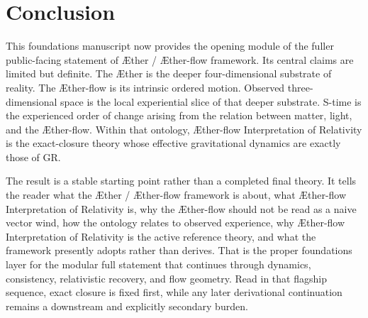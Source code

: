\documentclass[11pt]{article}
\newcommand{\Aether}{\AE{}ther}
\newcommand{\Aflow}{\AE{}ther-flow}
\newcommand{\TheoryName}{\Aflow{} Interpretation of Relativity}
\newcommand{\TheoryProgram}{\Aether{} / \Aflow{} framework}
\begin{document}
\section{Conclusion}

This foundations manuscript now provides the opening module of the fuller public-facing statement of \TheoryProgram{}. Its central claims are limited but definite. The \Aether{} is the deeper four-dimensional substrate of reality. The \Aflow{} is its intrinsic ordered motion. Observed three-dimensional space is the local experiential slice of that deeper substrate. S-time is the experienced order of change arising from the relation between matter, light, and the \Aflow{}. Within that ontology, \TheoryName{} is the exact-closure theory whose effective gravitational dynamics are exactly those of GR.

The result is a stable starting point rather than a completed final theory. It tells the reader what the \TheoryProgram{} is about, what \TheoryName{} is, why the \Aflow{} should not be read as a naive vector wind, how the ontology relates to observed experience, why \TheoryName{} is the active reference theory, and what the framework presently adopts rather than derives. That is the proper foundations layer for the modular full statement that continues through dynamics, consistency, relativistic recovery, and flow geometry. Read in that flagship sequence, exact closure is fixed first, while any later derivational continuation remains a downstream and explicitly secondary burden.
\end{document}
